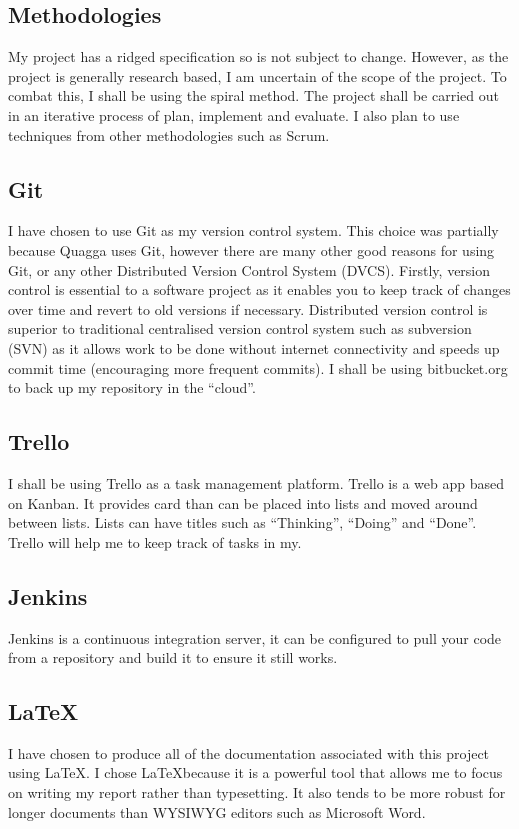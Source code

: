 \documentclass[12pt]{report}
\begin{document}
\subsection{Methodologies}
My project has a ridged specification so is not subject to change.
However, as the project is generally research based, I am uncertain of the scope
of the project. To combat this, I shall be using the spiral method. The project
shall be carried out in an iterative process of plan, implement and evaluate. I
also plan to use techniques from other methodologies such as Scrum. 

\subsection{Git}
I have chosen to use Git as my version control system. This choice was partially
because Quagga uses Git, however there are many other good reasons for using
Git, or any other Distributed Version Control System (DVCS). Firstly, version
control is essential to a software project as it enables you to keep track of
changes over time and revert to old versions if necessary. Distributed version
control is superior to traditional centralised version control system such as
subversion (SVN) as it allows work to be done without internet connectivity and
speeds up commit time (encouraging more frequent commits). I shall be
using bitbucket.org to back up my repository in the ``cloud''.

\subsection{Trello}
I shall be using Trello as a task management platform. Trello is a web app based
on Kanban. It provides card than can be placed into lists and moved around
between lists. Lists can have titles such as ``Thinking'', ``Doing'' and
``Done''. Trello will help me to keep track of tasks in my.

\subsection{Jenkins}
Jenkins is a continuous integration server, it can be configured to pull your
code from a repository and build it to ensure it still works.  

\subsection{\LaTeX}
I have chosen to produce all of the documentation associated with this project
using \LaTeX. I chose \LaTeX because it is a powerful tool that allows me to
focus on writing my report rather than typesetting. It also tends to be more
robust for longer documents than WYSIWYG editors such as Microsoft Word.
\end{document}

